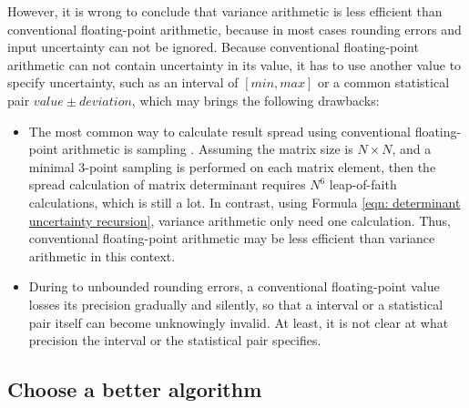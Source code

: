 \documentclass[twoside]{article}
\numberwithin{equation}{section}
\begin{document}
However, it is wrong to conclude that variance arithmetic is less efficient than conventional floating-point arithmetic, because in most cases rounding errors and input uncertainty can not be ignored.  Because conventional floating-point arithmetic can not contain uncertainty in its value, it has to use another value to specify uncertainty, such as an interval of $[min, max]$ or a common statistical pair $value \pm deviation$, which may brings the following drawbacks:
\begin{itemize}
\item The most common way to calculate result spread using conventional floating-point arithmetic is sampling \cite{Stochastic_Arithmetic} \cite{Numerical_Recipes}.  Assuming the matrix size is $N \times N$, and a minimal 3-point sampling is performed on each matrix element, then the spread calculation of matrix determinant requires $N^6$ leap-of-faith calculations, which is still a lot.  In contrast, using Formula \eqref{eqn: determinant uncertainty recursion}, variance arithmetic only need one calculation.  Thus, conventional floating-point arithmetic may be less efficient than variance arithmetic in this context. 

\item During to unbounded rounding errors, a conventional floating-point value losses its precision gradually and silently, so that a interval or a statistical pair itself can become unknowingly invalid.  At least, it is not clear at what precision the interval or the statistical pair specifies.
\end{itemize}


\subsection{Choose a better algorithm}
\end{document}

